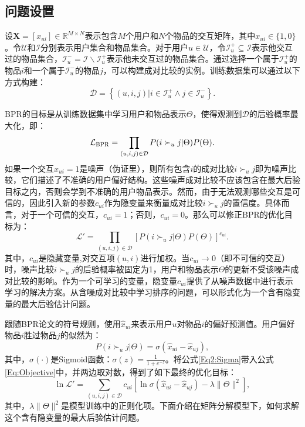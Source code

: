 \subsection{问题设置}
设$\mathbf{X}=[x_{ui}] \in \mathbb{R}^{M\times N}$表示包含$M$个用户和$N$个物品的交互矩阵，其中$x_{ui}\in \{1,0\}$。令$\mathcal{U}$和$\mathcal{I}$分别表示用户集合和物品集合。对于用户$u \in \mathcal{U}$，令$\mathcal{I}_u^+ \subseteq \mathcal{I}$表示他交互过的物品集合，$\mathcal{I}_u^- = \mathcal{I}\backslash \mathcal{I}_u^+$表示他未交互过的物品集合。通过选择一个属于$\mathcal{I}_u^+$的物品$i$和一个属于$\mathcal{I}_u^-$的物品$j$，可以构建成对比较的实例。训练数据集可以通过以下方式构建：
\begin{equation}\label{Eq2:obj}
	\mathcal{D} =  \left\{ {(u,i,j)|i \in \mathcal{I}_u^ +  \wedge j \in \mathcal{I}_u^ - } \right\}.
\end{equation}

BPR的目标是从训练数据集中学习用户和物品表示$\Theta$，使得观测到$\mathcal{D}$的后验概率最大化，即：
\begin{equation}\label{Eq:BPRObjective}
\mathcal{L}_\textsc{BPR} = \prod_{(u,i,j) \in \mathcal{D}} P(i \succ_u j|\Theta)P(\Theta).
\end{equation}
如果一个交互$x_{ui}=1$是噪声（伪证里），则所有包含$i$的成对比较$i \succ_u j$即为噪声比较，它们描述了不准确的用户偏好结构。这些噪声成对比较不应该包含在最大后验目标之内，否则会学到不准确的用户物品表示。然而，由于无法观测哪些交互是可信的，因此引入新的参数$c_{ui}$作为隐变量来衡量成对比较$i \succ_u j$的置信度。具体而言，对于一个可信的交互，$c_{ui}=1$；否则，$c_{ui}=0$。那么可以修正BPR的优化目标为：
\begin{equation}\label{Eq:Objective}
\mathcal{L}\prime = \prod_{(u,i,j) \in \mathcal{D}} [P(i \succ_u j|\Theta)P(\Theta)]^{c_{ui}}.
\end{equation}
其中，$c_{ui}$是隐藏变量,对交互项$(u,i)$进行加权。当$c_{ui} \rightarrow 0$（即不可信的交互）时，噪声比较$i \succ_u j$的后验概率被固定为1，用户和物品表示$\Theta$的更新不受该噪声成对比较的影响。作为一个可学习的变量，隐变量$c_{ui}$提供了从噪声数据中进行表示学习的解决方案。从含噪成对比较中学习排序的问题，可以形式化为一个含有隐变量的最大后验估计问题。

跟随BPR论文的符号规则，使用$\hat{x}_{ui}$来表示用户$u$对物品$i$的偏好预测值。用户偏好物品$i$胜过物品$j$的似然为：
\begin{equation}\label{Eq2:Sigma}
	P(i \succ_u j | \Theta) = \sigma(\hat{x}_{ui} - \hat{x}_{uj}),
\end{equation}
其中，$\sigma(\cdot)$是Sigmoid函数：$\sigma(z) = \frac{1}{1+e^{-z}}$。将公式\eqref{Eq2:Sigma}带入公式\eqref{Eq:Objective}中，并两边取对数，得到了如下最终的优化目标：
\begin{equation}\label{Eq:LogObjective}
\ln	\mathcal{L}\prime = \sum_{(u,i,j) \in \mathcal{D}} c_{ui}\left[\ln \sigma(\hat{x}_{ui} - \hat{x}_{uj}) - \lambda \|\Theta\|^2 \right],
\end{equation}
其中，$\lambda \|\Theta\|^2$是模型训练中的正则化项。下面介绍在矩阵分解模型下，如何求解这个含有隐变量的最大后验估计问题。
